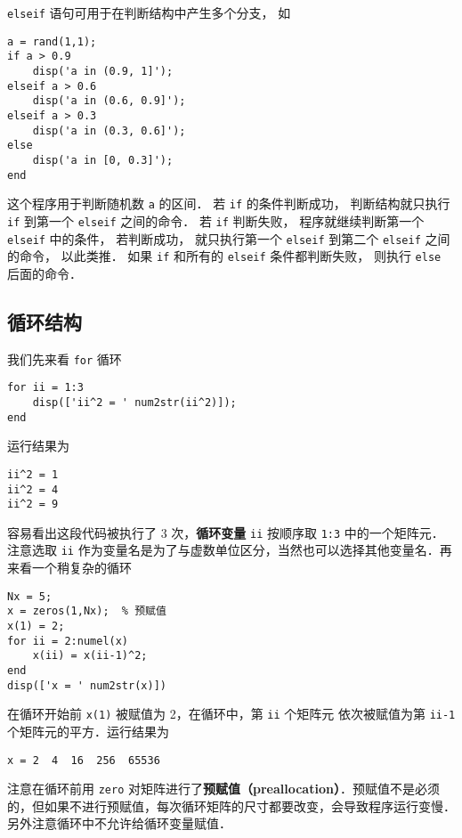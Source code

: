 \lstinline|elseif| 语句可用于在判断结构中产生多个分支， 如

\begin{lstlisting}[language=MyMatlab]
a = rand(1,1);
if a > 0.9
    disp('a in (0.9, 1]');
elseif a > 0.6
    disp('a in (0.6, 0.9]');
elseif a > 0.3
    disp('a in (0.3, 0.6]');
else
    disp('a in [0, 0.3]');
end
\end{lstlisting}

这个程序用于判断随机数 \lstinline|a| 的区间． 若 \lstinline|if| 的条件判断成功， 判断结构就只执行 \lstinline|if| 到第一个 \lstinline|elseif| 之间的命令． 若 \lstinline|if| 判断失败， 程序就继续判断第一个 \lstinline|elseif| 中的条件， 若判断成功， 就只执行第一个 \lstinline|elseif| 到第二个 \lstinline|elseif| 之间的命令， 以此类推． 如果 \lstinline|if| 和所有的 \lstinline|elseif| 条件都判断失败， 则执行 \lstinline|else| 后面的命令．

\subsection{循环结构}
我们先来看 \lstinline|for| 循环

\begin{lstlisting}[language=MyMatlab]
for ii = 1:3
    disp(['ii^2 = ' num2str(ii^2)]);
end
\end{lstlisting}

运行结果为
\begin{lstlisting}[language=MatlabCom]
ii^2 = 1
ii^2 = 4
ii^2 = 9
\end{lstlisting}
容易看出这段代码被执行了 3 次，\textbf{循环变量} \lstinline|ii| 按顺序取 \lstinline|1:3| 中的一个矩阵元．注意选取 \lstinline|ii| 作为变量名是为了与虚数单位区分，当然也可以选择其他变量名．再来看一个稍复杂的循环

\begin{lstlisting}[language=MyMatlab]
Nx = 5;
x = zeros(1,Nx);  % 预赋值
x(1) = 2;
for ii = 2:numel(x)
    x(ii) = x(ii-1)^2;
end
disp(['x = ' num2str(x)])
\end{lstlisting}

在循环开始前 \lstinline|x(1)| 被赋值为 2，在循环中，第 \lstinline|ii| 个矩阵元 依次被赋值为第 \lstinline|ii-1| 个矩阵元的平方．运行结果为
\begin{lstlisting}[language=MatlabCom]
x = 2  4  16  256  65536
\end{lstlisting}
注意在循环前用 \lstinline|zero| 对矩阵进行了\textbf{预赋值（preallocation）}．预赋值不是必须的，但如果不进行预赋值，每次循环矩阵的尺寸都要改变，会导致程序运行变慢．另外注意循环中不允许给循环变量赋值．


